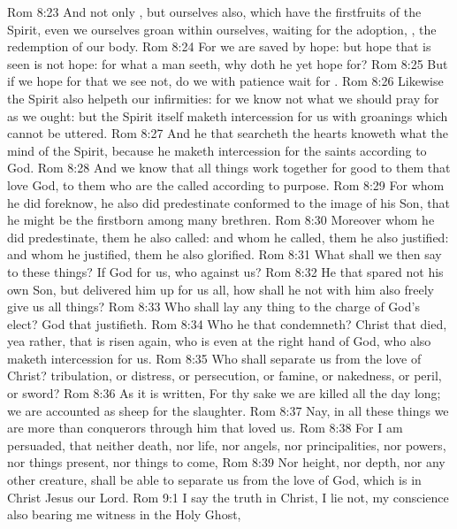 \vs Rom 8:23 And not only , but ourselves also, which have the firstfruits of the Spirit, even we ourselves groan within ourselves, waiting for the adoption, , the redemption of our body.
\vs Rom 8:24 For we are saved by hope: but hope that is seen is not hope: for what a man seeth, why doth he yet hope for?
\vs Rom 8:25 But if we hope for that we see not,  do we with patience wait for .
\vs Rom 8:26 Likewise the Spirit also helpeth our infirmities: for we know not what we should pray for as we ought: but the Spirit itself maketh intercession for us with groanings which cannot be uttered.
\vs Rom 8:27 And he that searcheth the hearts knoweth what  the mind of the Spirit, because he maketh intercession for the saints according to  God.
\vs Rom 8:28 And we know that all things work together for good to them that love God, to them who are the called according to  purpose.
\vs Rom 8:29 For whom he did foreknow, he also did predestinate  conformed to the image of his Son, that he might be the firstborn among many brethren.
\vs Rom 8:30 Moreover whom he did predestinate, them he also called: and whom he called, them he also justified: and whom he justified, them he also glorified.
\vs Rom 8:31 What shall we then say to these things? If God  for us, who  against us?
\vs Rom 8:32 He that spared not his own Son, but delivered him up for us all, how shall he not with him also freely give us all things?
\vs Rom 8:33 Who shall lay any thing to the charge of God's elect?  God that justifieth.
\vs Rom 8:34 Who  he that condemneth?  Christ that died, yea rather, that is risen again, who is even at the right hand of God, who also maketh intercession for us.
\vs Rom 8:35 Who shall separate us from the love of Christ?  tribulation, or distress, or persecution, or famine, or nakedness, or peril, or sword?
\vs Rom 8:36 As it is written, For thy sake we are killed all the day long; we are accounted as sheep for the slaughter.
\vs Rom 8:37 Nay, in all these things we are more than conquerors through him that loved us.
\vs Rom 8:38 For I am persuaded, that neither death, nor life, nor angels, nor principalities, nor powers, nor things present, nor things to come,
\vs Rom 8:39 Nor height, nor depth, nor any other creature, shall be able to separate us from the love of God, which is in Christ Jesus our Lord.
\vs Rom 9:1 I say the truth in Christ, I lie not, my conscience also bearing me witness in the Holy Ghost,
